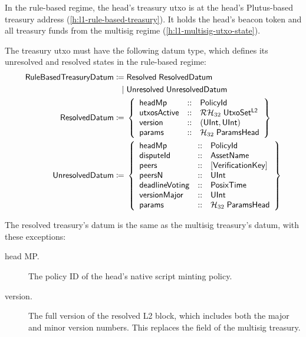 \documentclass[../hydrozoa.tex]{subfiles}
\begin{document}
In the rule-based regime, the head's treasury utxo is at the head's Plutus-based treasury address (\cref{h:l1-rule-based-treasury}).
It holds the head's beacon token and all treasury funds from the multisig regime (\cref{h:l1-multisig-utxo-state}).

The treasury utxo must have the following datum type, which defines its unresolved and resolved states in the rule-based regime:
\begin{equation*}
\begin{split}
  \mathsf{RuleBasedTreasuryDatum} \coloneq&\;
    \mathsf{Resolved} \; \mathsf{ResolvedDatum} \\\mid&\;
    \mathsf{Unresolved} \; \mathsf{UnresolvedDatum} \\
  \mathsf{ResolvedDatum} \coloneq&\;\left\{
    \begin{array}{lll}
      \mathsf{headMp} &::& \mathsf{PolicyId} \\
      \mathsf{utxosActive}  &::& \mathcal{RH}_{32} \; \mathsf{UtxoSet^{L2}} \\
      \mathsf{version} &::& (\mathsf{UInt}, \mathsf{UInt}) \\
      \mathsf{params} &::& \mathcal{H}_{32} \; \mathsf{ParamsHead}
    \end{array}\right\} \\
  \mathsf{UnresolvedDatum} \coloneq&\;\left\{
    \begin{array}{lll}
      \mathsf{headMp} &::& \mathsf{PolicyId} \\
      \mathsf{disputeId} &::& \mathsf{AssetName} \\
      \mathsf{peers} &::& \mathsf{[VerificationKey]} \\
      \mathsf{peersN} &::& \mathsf{UInt} \\
      \mathsf{deadlineVoting} &::& \mathsf{PosixTime} \\
      \mathsf{versionMajor} &::& \mathsf{UInt} \\
      \mathsf{params} &::& \mathcal{H}_{32} \; \mathsf{ParamsHead}
    \end{array}\right\}
\end{split}
\end{equation*}

The resolved treasury's datum is the same as the multisig treasury's datum, with these exceptions:
\begin{description}
  \item[head MP.] The policy ID of the head's native script minting policy.
  \item[version.] The full version of the resolved L2 block, which includes both the major and minor version numbers. This replaces the  field of the multisig treasury.
\end{description}
\end{document}
